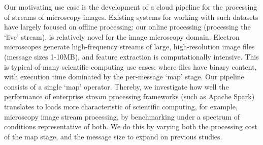 \documentclass[letterpaper,conference]{IEEEtran}
\begin{document}




Our motivating use case 
is the development of a cloud pipeline for the processing of streams of microscopy images. Existing systems for working with such datasets have largely focused on offline processing: our online processing (processing the `live' stream), 
is relatively novel for the image microscopy domain. %
Electron microscopes generate high-frequency streams of large, high-resolution image files (message sizes 1-10MB), and feature extraction is computationally intensive. This is typical of many scientific computing use cases: where files have binary content, 
with execution time dominated by the per-message `map' stage. Our pipeline consists of a single `map' operator. 
Thereby, we investigate how well the performance of enterprise stream processing frameworks (such as Apache Spark) translates to loads more characteristic of scientific computing, for example, microscopy image stream processing, by benchmarking under a spectrum of conditions representative of both. We do this by varying both the processing cost of the map stage, and the message size to expand on previous studies.

\end{document}
